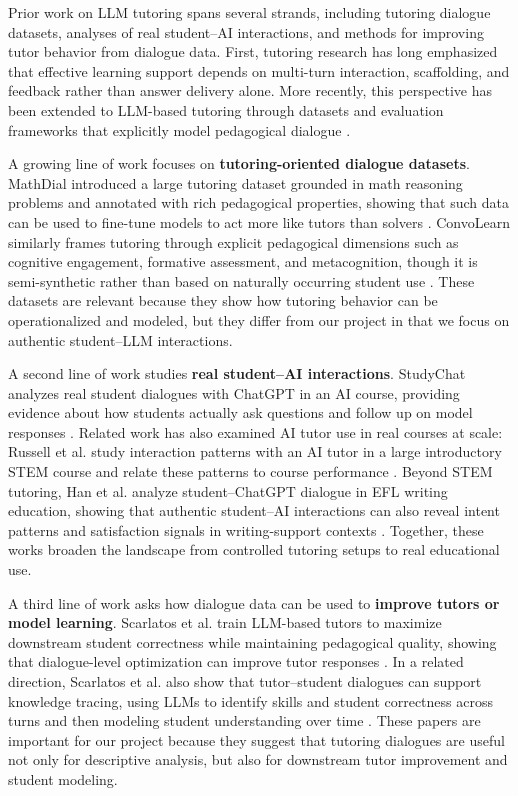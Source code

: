 Prior work on LLM tutoring spans several strands, including tutoring dialogue datasets, analyses of real student–AI interactions, and methods for improving tutor behavior from dialogue data. First, tutoring research has long emphasized that effective learning support depends on multi-turn interaction, scaffolding, and feedback rather than answer delivery alone. More recently, this perspective has been extended to LLM-based tutoring through datasets and evaluation frameworks that explicitly model pedagogical dialogue \citep{macina2023mathdial, sharma2026convolearn}.

A growing line of work focuses on \textbf{tutoring-oriented dialogue datasets}. MathDial introduced a large tutoring dataset grounded in math reasoning problems and annotated with rich pedagogical properties, showing that such data can be used to fine-tune models to act more like tutors than solvers \citep{macina2023mathdial}. ConvoLearn similarly frames tutoring through explicit pedagogical dimensions such as cognitive engagement, formative assessment, and metacognition, though it is semi-synthetic rather than based on naturally occurring student use \citep{sharma2026convolearn}. These datasets are relevant because they show how tutoring behavior can be operationalized and modeled, but they differ from our project in that we focus on authentic student--LLM interactions.

A second line of work studies \textbf{real student--AI interactions}. StudyChat analyzes real student dialogues with ChatGPT in an AI course, providing evidence about how students actually ask questions and follow up on model responses \citep{mcnichols2025studychat}. Related work has also examined AI tutor use in real courses at scale: Russell et al. study interaction patterns with an AI tutor in a large introductory STEM course and relate these patterns to course performance \citep{russell2025unlocking}. Beyond STEM tutoring, Han et al. analyze student--ChatGPT dialogue in EFL writing education, showing that authentic student--AI interactions can also reveal intent patterns and satisfaction signals in writing-support contexts \citep{han2023exploring}. Together, these works broaden the landscape from controlled tutoring setups to real educational use.

A third line of work asks how dialogue data can be used to \textbf{improve tutors or model learning}. Scarlatos et al. train LLM-based tutors to maximize downstream student correctness while maintaining pedagogical quality, showing that dialogue-level optimization can improve tutor responses \citep{scarlatos2025training}. In a related direction, Scarlatos et al. also show that tutor--student dialogues can support knowledge tracing, using LLMs to identify skills and student correctness across turns and then modeling student understanding over time \citep{scarlatos2025exploring}. These papers are important for our project because they suggest that tutoring dialogues are useful not only for descriptive analysis, but also for downstream tutor improvement and student modeling.

